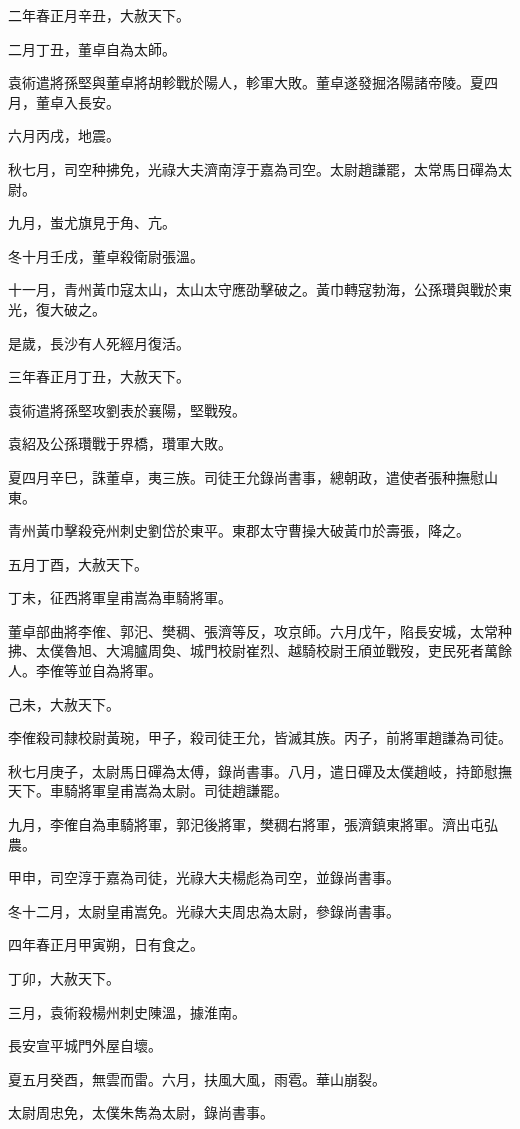 \begin{pinyinscope}
二年春正月辛丑，大赦天下。

二月丁丑，董卓自為太師。

袁術遣將孫堅與董卓將胡軫戰於陽人，軫軍大敗。董卓遂發掘洛陽諸帝陵。夏四月，董卓入長安。

六月丙戌，地震。

秋七月，司空种拂免，光祿大夫濟南淳于嘉為司空。太尉趙謙罷，太常馬日磾為太尉。

九月，蚩尤旗見于角、亢。

冬十月壬戌，董卓殺衛尉張溫。

十一月，青州黃巾寇太山，太山太守應劭擊破之。黃巾轉寇勃海，公孫瓚與戰於東光，復大破之。

是歲，長沙有人死經月復活。

三年春正月丁丑，大赦天下。

袁術遣將孫堅攻劉表於襄陽，堅戰歿。

袁紹及公孫瓚戰于界橋，瓚軍大敗。

夏四月辛巳，誅董卓，夷三族。司徒王允錄尚書事，總朝政，遣使者張种撫慰山東。

青州黃巾擊殺兗州刺史劉岱於東平。東郡太守曹操大破黃巾於壽張，降之。

五月丁酉，大赦天下。

丁未，征西將軍皇甫嵩為車騎將軍。

董卓部曲將李傕、郭汜、樊稠、張濟等反，攻京師。六月戊午，陷長安城，太常种拂、太僕魯旭、大鴻臚周奐、城門校尉崔烈、越騎校尉王頎並戰歿，吏民死者萬餘人。李傕等並自為將軍。

己未，大赦天下。

李傕殺司隸校尉黃琬，甲子，殺司徒王允，皆滅其族。丙子，前將軍趙謙為司徒。

秋七月庚子，太尉馬日磾為太傅，錄尚書事。八月，遣日磾及太僕趙岐，持節慰撫天下。車騎將軍皇甫嵩為太尉。司徒趙謙罷。

九月，李傕自為車騎將軍，郭汜後將軍，樊稠右將軍，張濟鎮東將軍。濟出屯弘農。

甲申，司空淳于嘉為司徒，光祿大夫楊彪為司空，並錄尚書事。

冬十二月，太尉皇甫嵩免。光祿大夫周忠為太尉，參錄尚書事。

四年春正月甲寅朔，日有食之。

丁卯，大赦天下。

三月，袁術殺楊州刺史陳溫，據淮南。

長安宣平城門外屋自壞。

夏五月癸酉，無雲而雷。六月，扶風大風，雨雹。華山崩裂。

太尉周忠免，太僕朱雋為太尉，錄尚書事。


\end{pinyinscope}
